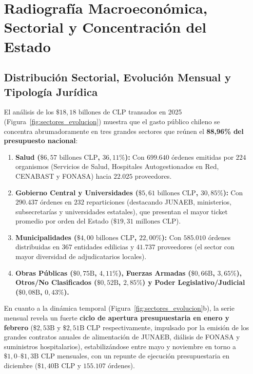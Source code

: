 \documentclass[11pt,a4paper]{article}
\begin{document}
\section{Radiografía Macroeconómica, Sectorial y Concentración del Estado}

\subsection{Distribución Sectorial, Evolución Mensual y Tipología Jurídica}

El análisis de los $\$18,18\text{ billones de CLP}$ transados en 2025 (Figura~\ref{fig:sectores_evolucion}) muestra que el gasto público chileno se concentra abrumadoramente en tres grandes sectores que reúnen el \textbf{88,96\% del presupuesto nacional}:
\begin{enumerate}
    \item \textbf{Salud ($\$6,57\text{ billones CLP}$, $36,11\%$):} Con $699.640$ órdenes emitidas por $224$ organismos (Servicios de Salud, Hospitales Autogestionados en Red, CENABAST y FONASA) hacia $22.025$ proveedores.
    \item \textbf{Gobierno Central y Universidades ($\$5,61\text{ billones CLP}$, $30,85\%$):} Con $290.437$ órdenes en $232$ reparticiones (destacando JUNAEB, ministerios, subsecretarías y universidades estatales), que presentan el mayor ticket promedio por orden del Estado ($\$19,31\text{ millones CLP}$).
    \item \textbf{Municipalidades ($\$4,00\text{ billones CLP}$, $22,00\%$):} Con $585.010$ órdenes distribuidas en $367$ entidades edilicias y $41.737$ proveedores (el sector con mayor diversidad de adjudicatarios locales).
    \item \textbf{Obras Públicas ($\$0,75\text{B}$, $4,11\%$), Fuerzas Armadas ($\$0,66\text{B}$, $3,65\%$), Otros/No Clasificados ($\$0,52\text{B}$, $2,85\%$) y Poder Legislativo/Judicial ($\$0,08\text{B}$, $0,43\%$).}
\end{enumerate}

En cuanto a la dinámica temporal (Figura~\ref{fig:sectores_evolucion}b), la serie mensual revela un fuerte \textbf{ciclo de apertura presupuestaria en enero y febrero} ($\$2,53\text{B}$ y $\$2,51\text{B CLP}$ respectivamente, impulsado por la emisión de los grandes contratos anuales de alimentación de JUNAEB, diálisis de FONASA y suministros hospitalarios), estabilizándose entre mayo y noviembre en torno a $\$1,0\text{--}\$1,3\text{B CLP}$ mensuales, con un repunte de ejecución presupuestaria en diciembre ($\$1,40\text{B CLP}$ y $155.107$ órdenes).
\end{document}

